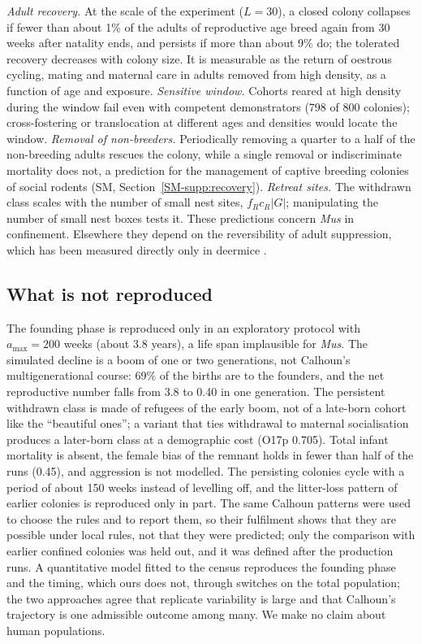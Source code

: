 \emph{Adult recovery.} At the scale of the experiment ($L=30$), a closed colony collapses if fewer than about 1\%
of the adults of reproductive age breed again from 30 weeks after natality ends, and persists if more than about 9\%
do; the tolerated recovery decreases with colony size. It is measurable as the return of oestrous cycling, mating and maternal care in adults removed
from high density, as a function of age and exposure.
\emph{Sensitive window.} Cohorts reared at high density during the window fail even with competent demonstrators
(798 of 800 colonies); cross-fostering or translocation at different ages and densities would locate the window.
\emph{Removal of non-breeders.} Periodically removing a quarter to a half of the non-breeding adults rescues the
colony, while a single removal or indiscriminate mortality does not, a prediction for the management of captive
breeding colonies of social rodents (SM, Section~\ref{SM-supp:recovery}).
\emph{Retreat sites.} The withdrawn class scales with the number of small nest sites, $f_Rc_R|G|$; manipulating the
number of small nest boxes tests it.
These predictions concern \emph{Mus} in confinement. Elsewhere they depend on the reversibility of adult
suppression, which has been measured directly only in deermice \citep{Terman1973}.

\subsection{What is not reproduced}

The founding phase is reproduced only in an exploratory protocol with $a_{\max}=200$ weeks (about 3.8 years), a life
span implausible for \emph{Mus}. The simulated decline is a boom of one or two generations, not Calhoun's
multigenerational course: 69\% of the births are to the founders, and the net reproductive number falls from 3.8 to
0.40 in one generation. The persistent withdrawn class is made of refugees of the early boom, not of a late-born
cohort like the ``beautiful ones''; a variant that ties withdrawal to maternal socialisation produces a later-born
class at a demographic cost (O17p 0.705). Total infant mortality is absent, the female bias of the remnant holds in
fewer than half of the runs (0.45), and aggression is not modelled. The persisting colonies cycle with a period of
about 150 weeks instead of levelling off, and the litter-loss pattern of earlier colonies is reproduced only in part.
The same Calhoun patterns were used to choose the rules and to report them, so their fulfilment shows that they are
possible under local rules, not that they were predicted; only the comparison with earlier
confined colonies was held out, and it was defined after the production runs. A
quantitative model fitted to the census \citep{GwizdallaDus2026} reproduces the founding phase and the timing, which
ours does not, through switches on the total population; the two approaches agree that replicate variability is
large and that Calhoun's trajectory is one admissible outcome among many. We make no claim about human populations.
